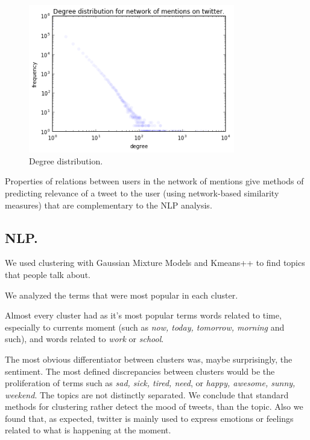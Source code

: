 \documentclass[%
 reprint,
 amsmath,amssymb,
 aps,
]{revtex4-1}
\begin{document}
\begin{figure}[htp]
\centering
\includegraphics[width=9cm]{deg_dist}
\caption{Degree distribution.}
\label{fig}
\end{figure}


Properties of relations between users in the network of mentions give methods of predicting relevance of a tweet to the user (using network-based similarity measures) that are complementary to the NLP analysis.


\newpage

\subsection{NLP.}

We used clustering with Gaussian Mixture Models and Kmeans++ to find topics that people talk about.

We analyzed the terms that were most popular in each cluster.

Almost every cluster had as it's most popular terms words related to time, especially to currents moment (such as \textit{now, today, tomorrow, morning} and such), and words related to \textit{work} or \textit{school}.

The most obvious differentiator between clusters was, maybe surprisingly, the sentiment. The most defined discrepancies between clusters would be the proliferation of terms such as \textit{sad, sick, tired, need}, or \textit{happy, awesome, sunny, weekend}. The topics are not distinctly separated. We conclude that standard methods for clustering rather detect the mood of tweets, than the topic. Also we found that, as expected, twitter is mainly used to express emotions or feelings related to what is happening at the moment. 
\end{document}
